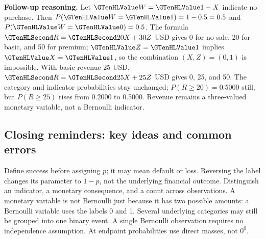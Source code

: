 \textbf{Follow-up reasoning.} Let $\Indicator{W}=\Indicator{1}-X$ indicate no purchase. Then $P(\Indicator{W}=\Indicator{1})=1-0.5=0.5$ and $P(\Indicator{W}=\Indicator{0})=0.5$. The formula $\Money{R}=\Money{20}X+30Z$ USD gives 0 for no sale, 20 for basic, and 50 for premium; $\Indicator{Z}=\Indicator{1}$ implies $\Indicator{X}=\Indicator{1}$, so the combination $(X,Z)=(0,1)$ is impossible. With basic revenue 25 USD, $\Money{R}=\Money{25}X+25Z$ USD gives 0, 25, and 50. The category and indicator probabilities stay unchanged; $P(R\geq20)=0.5000$ still, but $P(R\geq25)$ rises from 0.2000 to 0.5000. Revenue remains a three-valued monetary variable, not a Bernoulli indicator.

\subsection*{Closing reminders: key ideas and common errors}
Define success before assigning $p$; it may mean default or loss. Reversing the label
changes its parameter to $1-p$, not the underlying financial outcome. Distinguish
an indicator, a monetary consequence, and a count across observations.
A monetary variable is not Bernoulli just because it has two possible amounts:
a Bernoulli variable uses the labels 0 and 1. Several underlying categories may still
be grouped into one binary event. A single Bernoulli observation requires no independence
assumption. At endpoint probabilities use direct masses, not $0^0$.

